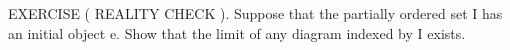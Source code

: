 EXERCISE ( REALITY CHECK ). Suppose that the partially ordered set I has an initial object e. Show that the limit of any diagram indexed by I exists.
